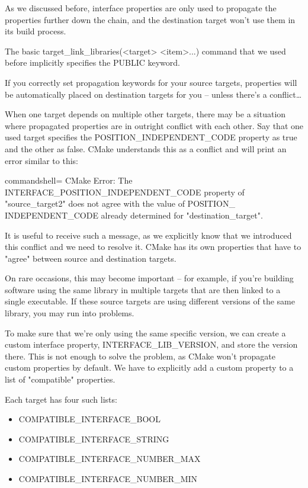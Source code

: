 As we discussed before, interface properties are only used to propagate the properties further down the chain, and the destination target won't use them in its build process.

The basic target\_link\_libraries(<target> <item>...) command that we used before implicitly specifies the PUBLIC keyword.

If you correctly set propagation keywords for your source targets, properties will be automatically placed on destination targets for you – unless there's a conflict…


When one target depends on multiple other targets, there may be a situation where propagated properties are in outright conflict with each other. Say that one used target specifies the POSITION\_INDEPENDENT\_CODE property as true and the other as false. CMake understands this as a conflict and will print an error similar to this:

\begin{tcblisting}{commandshell={}}
CMake Error: The INTERFACE_POSITION_INDEPENDENT_CODE property
of "source_target2" does not agree with the value of POSITION_
INDEPENDENT_CODE already determined for "destination_target".
\end{tcblisting}

It is useful to receive such a message, as we explicitly know that we introduced this conflict and we need to resolve it. CMake has its own properties that have to "agree" between source and destination targets.

On rare occasions, this may become important – for example, if you're building software using the same library in multiple targets that are then linked to a single executable. If these source targets are using different versions of the same library, you may run into problems.

To make sure that we're only using the same specific version, we can create a custom interface property, INTERFACE\_LIB\_VERSION, and store the version there. This is not enough to solve the problem, as CMake won't propagate custom properties by default. We have to explicitly add a custom property to a list of "compatible" properties.

Each target has four such lists:

\begin{itemize}
\item 
COMPATIBLE\_INTERFACE\_BOOL

\item 
COMPATIBLE\_INTERFACE\_STRING

\item 
COMPATIBLE\_INTERFACE\_NUMBER\_MAX

\item 
COMPATIBLE\_INTERFACE\_NUMBER\_MIN
\end{itemize}

